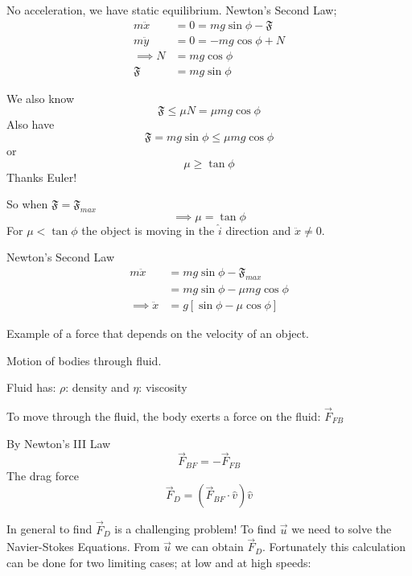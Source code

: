 \documentclass[10pt]{scrartcl}
\begin{document}
\begin{example}
No acceleration, we have static equilibrium. Newton's Second Law;
\begin{align*}
m\ddot{x} &= 0 = mg\sin\phi - \mathfrak{F} \tag{i}\\	
m\ddot{y} &= 0 = -mg\cos\phi + N \tag{ii}\\
\implies N &= mg\cos\phi\\
 \mathfrak{F} &= mg\sin\phi 
\end{align*}

We also know 
\[\mathfrak{F} \leq \mu N = \mu mg\cos\phi\]
Also have 
\[\mathfrak{F} = mg\sin\phi \leq \mu mg \cos\phi\]
or 
\[\mu \geq \tan\phi\] 
Thanks Euler!

So when $\mathfrak{F} = \mathfrak{F}_{max}$
\[\implies \mu = \tan\phi\]
For $\mu < \tan\phi$ the object is moving in the $\hat{i}$ direction and $\ddot{x} \neq 0$. 

Newton's Second Law
\[
\begin{aligned}
m\ddot{x} &= mg\sin\phi - \mathfrak{F}_{max}\\
&= mg\sin\phi - \mu mg\cos\phi \\
\implies \ddot{x} &= g[\sin\phi - \mu\cos\phi]	
\end{aligned}
\]
\end{example}


Example  of a force that depends on the velocity of an object. 

Motion of bodies through fluid. 
\begin{center}
\end{center}

Fluid has: $\rho$: density and $\eta$: viscosity

To move through the fluid, the body exerts a force on the fluid: $\vec{F}_{FB}$

By Newton's III Law
\[\vec{F}_{BF} = -\vec{F}_{FB}\]
The drag force \[\vec{F}_D = (\vec{F}_{BF}\cdot \hat{v})\hat{v}\]

In general to find $\vec{F}_{D}$ is a challenging problem! To find $\vec{u}$ we need to solve the Navier-Stokes Equations. From $\vec{u}$ we can obtain $\vec{F}_D$. Fortunately this calculation can be done for two limiting cases; at low and at high speeds:
\end{document}
